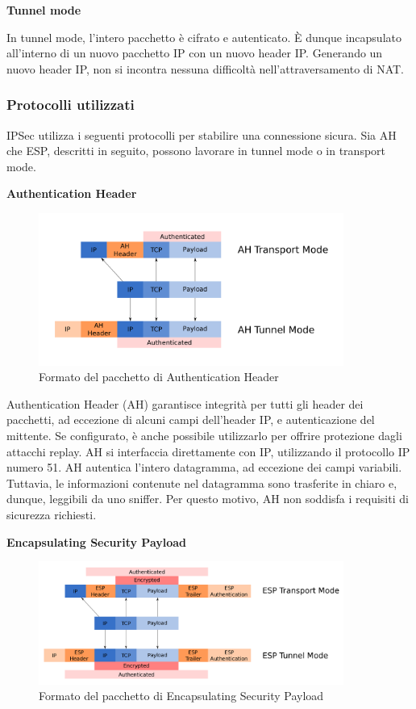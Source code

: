 \noindent \textbf{Tunnel mode}

In tunnel mode, l'intero pacchetto è cifrato e autenticato. È dunque incapsulato all'interno di un nuovo pacchetto IP con un nuovo header IP.
Generando un nuovo header IP, non si incontra nessuna difficoltà nell'attraversamento di NAT.


\subsubsection{Protocolli utilizzati}
IPSec utilizza i seguenti protocolli per stabilire una connessione sicura. Sia AH che ESP, descritti in seguito, possono lavorare in tunnel mode o in transport mode.

\noindent \textbf{Authentication Header}

\begin{figure}[ht]
    \centering
    \includegraphics[width=10cm]{figure/ah_tun_trasp.png}
    \caption{Formato del pacchetto di Authentication Header}
\end{figure}

Authentication Header \cite[RFC4302]{RFC4302} (AH) garantisce integrità per tutti gli header dei pacchetti, ad eccezione di alcuni campi dell'header IP, e autenticazione del mittente. Se configurato, è anche possibile utilizzarlo per offrire protezione dagli attacchi replay. AH si interfaccia direttamente con IP, utilizzando il protocollo IP numero 51.
AH autentica l'intero datagramma, ad eccezione dei campi variabili. Tuttavia, le informazioni contenute nel datagramma sono trasferite in chiaro e, dunque, leggibili da uno sniffer. Per questo motivo, AH non soddisfa i requisiti di sicurezza richiesti.

\newpage
\noindent \textbf{Encapsulating Security Payload}

\begin{figure}[ht]
    \centering
    \includegraphics[width=10cm]{figure/esp_tun_trasp.png}
    \caption{Formato del pacchetto di Encapsulating Security Payload}
\end{figure}

